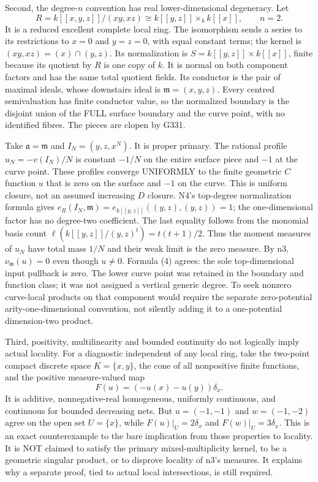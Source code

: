 \documentclass[
  11pt,
]{article}
\begin{document}
Second, the degree-\(n\) convention has real lower-dimensional
degeneracy. Let
\[R=k[[x,y,z]]/(xy,xz)\cong k[[y,z]]\times_k k[[x]],\qquad n=2.\] It is
a reduced excellent complete local ring. The isomorphism sends a series
to its restrictions to \(x=0\) and \(y=z=0\), with equal constant terms;
the kernel is \((xy,xz)=(x)\cap(y,z)\). Its normalization is
\(S=k[[y,z]]\times k[[x]]\), finite because its quotient by \(R\) is one
copy of \(k\). It is normal on both component factors and has the same
total quotient fields. Its conductor is the pair of maximal ideals,
whose downstairs ideal is \(\mathfrak m=(x,y,z)\). Every centred
semivaluation has finite conductor value, so the normalized boundary is
the disjoint union of the FULL surface boundary and the curve point,
with no identified fibres. The pieces are clopen by G331.

Take \(\mathfrak a=\mathfrak m\) and \(I_N=(y,z,x^N)\). It is proper
primary. The rational profile \(u_N=-v(I_N)/N\) is constant \(-1/N\) on
the entire surface piece and \(-1\) at the curve point. These profiles
converge UNIFORMLY to the finite geometric \(C\) function \(u\) that is
zero on the surface and \(-1\) on the curve. This is uniform closure,
not an assumed increasing \(D\) closure. N4's top-degree normalization
formula gives \(e_R(I_N,\mathfrak m)=e_{k[[y,z]]}((y,z),(y,z))=1\); the
one-dimensional factor has no degree-two coefficient. The last equality
follows from the monomial basis count
\(\ell(k[[y,z]]/(y,z)^t)=t(t+1)/2\). Thus the moment measures of \(u_N\)
have total mass \(1/N\) and their weak limit is the zero measure. By n3,
\(\nu_{\mathfrak m}(u)=0\) even though \(u\ne0\). Formula (4) agrees:
the sole top-dimensional input pullback is zero. The lower curve point
was retained in the boundary and function class; it was not assigned a
vertical generic degree. To seek nonzero curve-local products on that
component would require the separate zero-potential
arity-one-dimensional convention, not silently adding it to a
one-potential dimension-two product.

Third, positivity, multilinearity and bounded continuity do not
logically imply actual locality. For a diagnostic independent of any
local ring, take the two-point compact discrete space \(K=\{x,y\}\), the
cone of all nonpositive finite functions, and the positive
measure-valued map \[F(u)=(-u(x)-u(y))\delta_x.\] It is additive,
nonnegative-real homogeneous, uniformly continuous, and continuous for
bounded decreasing nets. But \(u=(-1,-1)\) and \(w=(-1,-2)\) agree on
the open set \(U=\{x\}\), while \(F(u)|_U=2\delta_x\) and
\(F(w)|_U=3\delta_x\). This is an exact counterexample to the bare
implication from those properties to locality. It is NOT claimed to
satisfy the primary mixed-multiplicity kernel, to be a geometric
singular product, or to disprove locality of n3's measures. It explains
why a separate proof, tied to actual local intersections, is still
required.
\end{document}
